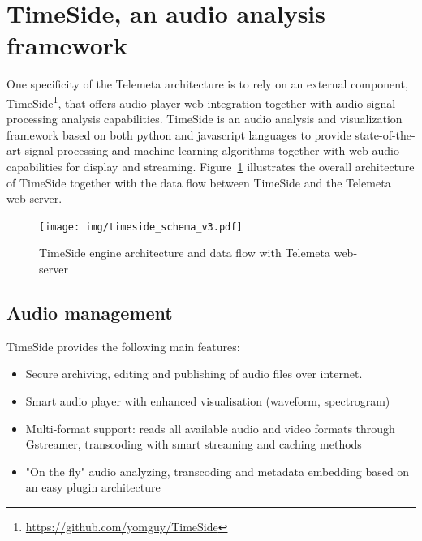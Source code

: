 \documentclass{sig-alternate}
\begin{document}
\section{TimeSide, an audio analysis framework}\label{sec:TimeSide}
One specificity of the Telemeta architecture is to rely on an external component, TimeSide\footnote{\url{https://github.com/yomguy/TimeSide}}, that offers audio player web integration together with audio signal processing analysis capabilities. 
TimeSide is an audio analysis and visualization framework based on both python and javascript languages to provide state-of-the-art signal processing and machine learning algorithms together with web audio capabilities for display and streaming.
Figure~\ref{fig:TimeSide_Archi} illustrates the overall architecture of TimeSide together with the data flow between TimeSide and the Telemeta web-server.
\begin{figure}[htbp]
  \centering
  \texttt{[image: img/timeside\_schema\_v3.pdf]}
  \caption{TimeSide engine architecture and data flow with Telemeta web-server}\label{fig:TimeSide_Archi}
\end{figure}
\subsection{Audio management}
TimeSide provides the following main features:
\begin{itemize}
\item Secure archiving, editing and publishing of audio files over
  internet.
\item Smart audio player with enhanced visualisation (waveform, spectrogram)
\item Multi-format support: reads all available audio and video formats  through Gstreamer, transcoding with smart streaming and caching methods%
\item "On the fly" audio analyzing, transcoding and metadata
    embedding based on an easy plugin architecture
\end{itemize}
\end{document}
